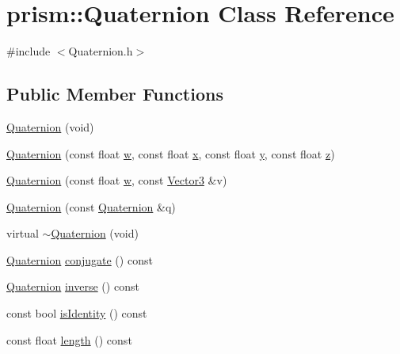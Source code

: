 \hypertarget{classprism_1_1_quaternion}{}\section{prism\+:\+:Quaternion Class Reference}
\label{classprism_1_1_quaternion}


{\ttfamily \#include $<$Quaternion.\+h$>$}

\subsection*{Public Member Functions}
\begin{DoxyCompactItemize}
\item 
\hyperlink{classprism_1_1_quaternion_a0d060b8d3623e2add1d269b4e999663d}{Quaternion} (void)
\item 
\hyperlink{classprism_1_1_quaternion_a331e2d14e97aa22f2cce92088ad5594a}{Quaternion} (const float \hyperlink{classprism_1_1_quaternion_aa930b57c8fbba2855722e82080a23cce}{w}, const float \hyperlink{classprism_1_1_quaternion_ab3f80fc41a933a371b2861363997ce22}{x}, const float \hyperlink{classprism_1_1_quaternion_a37023ce86684cb19287ec52cf27072f7}{y}, const float \hyperlink{classprism_1_1_quaternion_a8af7b070028c48f61d1a76b1b49cbaac}{z})
\item 
\hyperlink{classprism_1_1_quaternion_a04c1b60ecb122ea1eaae090a0e98c083}{Quaternion} (const float \hyperlink{classprism_1_1_quaternion_aa930b57c8fbba2855722e82080a23cce}{w}, const \hyperlink{classprism_1_1_vector3}{Vector3} \&v)
\item 
\hyperlink{classprism_1_1_quaternion_af88cd63d0c271ee5e3f7ba74e3349584}{Quaternion} (const \hyperlink{classprism_1_1_quaternion}{Quaternion} \&q)
\item 
virtual \hyperlink{classprism_1_1_quaternion_a1430a69408c646b34a90ea10616599ea}{$\sim$\+Quaternion} (void)
\item 
\hyperlink{classprism_1_1_quaternion}{Quaternion} \hyperlink{classprism_1_1_quaternion_a62430c8b98581769edbc6d339b4ea17b}{conjugate} () const 
\item 
\hyperlink{classprism_1_1_quaternion}{Quaternion} \hyperlink{classprism_1_1_quaternion_add4c30a874ca1d215c299759e4dd9961}{inverse} () const 
\item 
const bool \hyperlink{classprism_1_1_quaternion_a306069da4c274138899739dc30030ffb}{is\+Identity} () const 
\item 
const float \hyperlink{classprism_1_1_quaternion_a3f40222bff891b3320b7934f4e7e72e6}{length} () const 

\end{DoxyCompactItemize}
